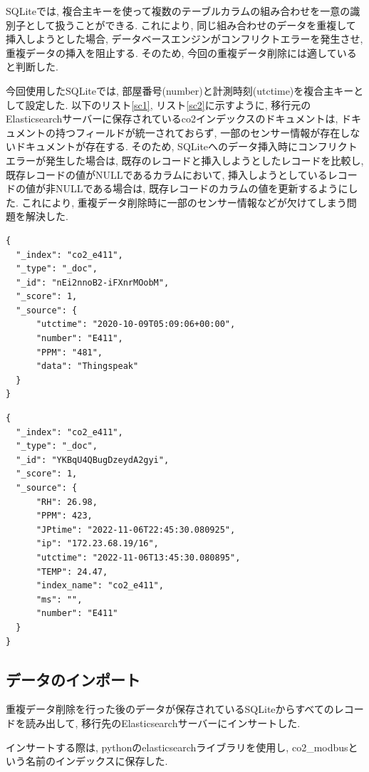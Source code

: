 SQLiteでは, 複合主キーを使って複数のテーブルカラムの組み合わせを一意の識別子として扱うことができる. これにより, 同じ組み合わせのデータを重複して挿入しようとした場合, データベースエンジンがコンフリクトエラーを発生させ, 重複データの挿入を阻止する. そのため, 今回の重複データ削除には適していると判断した.

今回使用したSQLiteでは, 部屋番号(number)と計測時刻(utctime)を複合主キーとして設定した. 以下のリスト\ref{sc1}, リスト\ref{sc2}に示すように, 移行元のElasticsearchサーバーに保存されているco2インデックスのドキュメントは, ドキュメントの持つフィールドが統一されておらず, 一部のセンサー情報が存在しないドキュメントが存在する. そのため, SQLiteへのデータ挿入時にコンフリクトエラーが発生した場合は, 既存のレコードと挿入しようとしたレコードを比較し, 既存レコードの値がNULLであるカラムにおいて, 挿入しようとしているレコードの値が非NULLである場合は, 既存レコードのカラムの値を更新するようにした. これにより, 重複データ削除時に一部のセンサー情報などが欠けてしまう問題を解決した.

\begin{lstlisting}[caption=\_sourceフィールドのメンバー数が少ないドキュメント, label=sc1]
{
  "_index": "co2_e411",
  "_type": "_doc",
  "_id": "nEi2nnoB2-iFXnrMOobM",
  "_score": 1,
  "_source": {
      "utctime": "2020-10-09T05:09:06+00:00",
      "number": "E411",
      "PPM": "481",
      "data": "Thingspeak"
  }
}
  \end{lstlisting}

\begin{lstlisting}[caption=\_sourceフィールドのメンバー数が多いドキュメント, label=sc2]
{
  "_index": "co2_e411",
  "_type": "_doc",
  "_id": "YKBqU4QBugDzeydA2gyi",
  "_score": 1,
  "_source": {
      "RH": 26.98,
      "PPM": 423,
      "JPtime": "2022-11-06T22:45:30.080925",
      "ip": "172.23.68.19/16",
      "utctime": "2022-11-06T13:45:30.080895",
      "TEMP": 24.47,
      "index_name": "co2_e411",
      "ms": "",
      "number": "E411"
  }
}
    \end{lstlisting}

\subsection{データのインポート}
重複データ削除を行った後のデータが保存されているSQLiteからすべてのレコードを読み出して, 移行先のElasticsearchサーバーにインサートした.

インサートする際は, pythonのelasticsearchライブラリを使用し, co2\_modbusという名前のインデックスに保存した.

